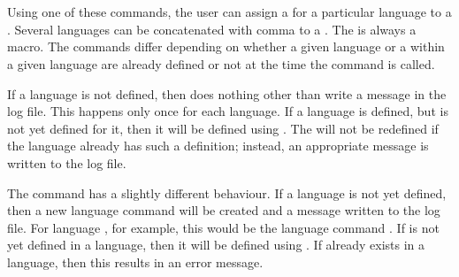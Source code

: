 \begin{Declaration}
    \\
    \\
    \\
    \\
    \\
    \\
    \\
\end{Declaration}
%
%
%
%
Using one of these commands, the user can assign a  for a
particular language to a . Several languages can be concatenated
with comma to a .  The  is always a
macro. The commands differ depending on whether a given language or a
 within a given language are already defined or not at the
time the command is called.

If a language is not defined, then  does
nothing other than write a message in the log file. This happens only once
for each language.  If a language is defined, but  is not yet
defined for it, then it will be defined using .  The
 will not be redefined if the language already has such a
definition; instead, an appropriate message is written to the log file.

The command  has a slightly different behaviour.  If a
language is not yet defined, then a new language command will be
created and a message written to the log file. For language
, for example, this would be the language command
. If  is not yet defined in a
language, then it will be defined using .  If
 already exists in a language, then this results in an error
message.

